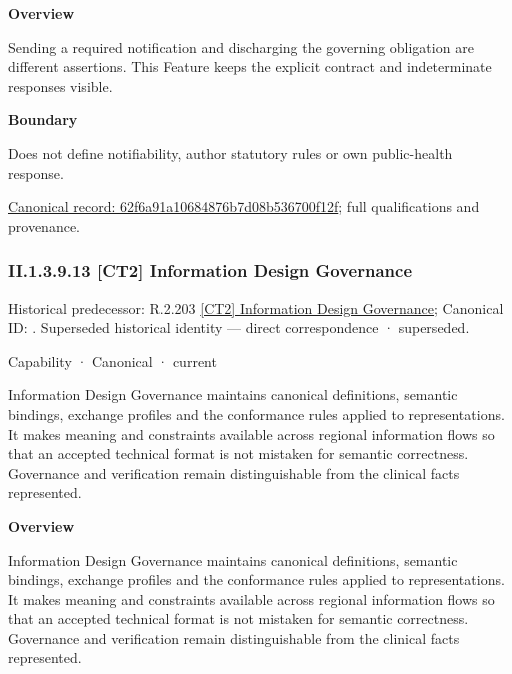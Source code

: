 \textbf{Overview}



Sending a required notification and discharging the governing obligation are different assertions. This Feature keeps the explicit contract and indeterminate responses visible.



\textbf{Boundary}



Does not define notifiability, author statutory rules or own public-health response.


{\footnotesize \href{../../../../continuum/strategy/capability/feature/62f6a91a10684876b7d08b536700f12f.md}{Canonical record: 62f6a91a10684876b7d08b536700f12f}; full qualifications and provenance.}\par
\subsubsection*{II.1.3.9.13 [CT2] Information Design Governance}
\label{navigation:II.1.3.9.13}

{\small Historical predecessor: R.2.203 \hyperref[element:0bdd7f8c0cd74d9fabc49801af037fc2]{[CT2] Information Design Governance}; Canonical ID: \texttt{}. Superseded historical identity — direct correspondence · superseded.}\par
\label{element:f39ed9ebcc724857a4bf7a2b8e045c7a}
{\small Capability · Canonical · current}\par

Information Design Governance maintains canonical definitions, semantic bindings, exchange profiles and the conformance rules applied to representations. It makes meaning and constraints available across regional information flows so that an accepted technical format is not mistaken for semantic correctness. Governance and verification remain distinguishable from the clinical facts represented.



\textbf{Overview}



Information Design Governance maintains canonical definitions, semantic bindings, exchange profiles and the conformance rules applied to representations. It makes meaning and constraints available across regional information flows so that an accepted technical format is not mistaken for semantic correctness. Governance and verification remain distinguishable from the clinical facts represented.



